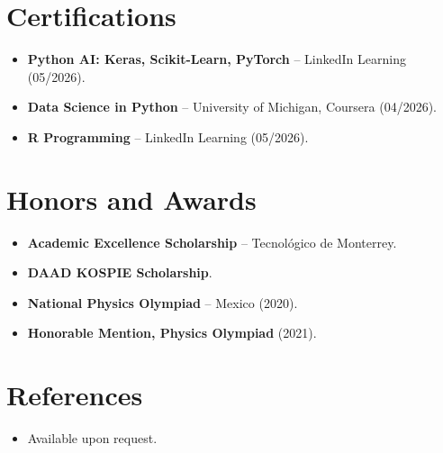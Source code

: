 \documentclass[11pt,a4paper,sans]{moderncv}
\begin{document}

\section{Certifications}
\vspace{1pt}
\begin{itemize}
\item{\textbf{Python AI: Keras, Scikit-Learn, PyTorch} -- LinkedIn Learning (05/2026).}
\item{\textbf{Data Science in Python} -- University of Michigan, Coursera (04/2026).}
\item{\textbf{R Programming} -- LinkedIn Learning (05/2026).}
\end{itemize}


\section{Honors and Awards}
\vspace{1pt}
\begin{itemize}
\item{\textbf{Academic Excellence Scholarship} -- Tecnológico de Monterrey.}
\item{\textbf{DAAD KOSPIE Scholarship}.}
\item{\textbf{National Physics Olympiad} -- Mexico (2020).}
\item{\textbf{Honorable Mention, Physics Olympiad} (2021).}
\end{itemize}


\section{References}
\vspace{1pt}
\begin{itemize}
\item{Available upon request.}
\end{itemize}
\end{document}
